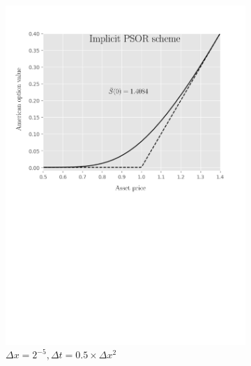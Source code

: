 \begin{figure}[tbp]
\begin{subfigure}{0.4\textwidth}
    \includegraphics[width=\textwidth]{chapters/chapter5/TestCase3ImplicitLCP.pdf}
    \caption{$\Delta{x}=2^{-5}, \Delta{t}=0.5\times\Delta{x}^2$}
    \label{fig:lcp:numericaresults:test_case_3_implicit}
  \end{subfigure}
  \hspace{0.5cm}
  \begin{subfigure}{0.4\textwidth}
    \label{fig:lcp:numericaresults:test_case_3_crank_nicholson}
    \centering

\end{subfigure}
\end{figure}
